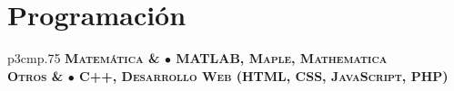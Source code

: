 
\section{{Programaci\'on}}

\begin{tabular}{p{3cm}p{.75\linewidth}}
\hfill\bfseries\scshape Matem\'atica & $\bullet$ MATLAB, Maple, Mathematica\\
\hfill\bfseries\scshape Otros & $\bullet$ C++, Desarrollo Web (HTML, CSS, JavaScript, PHP)
\end{tabular}